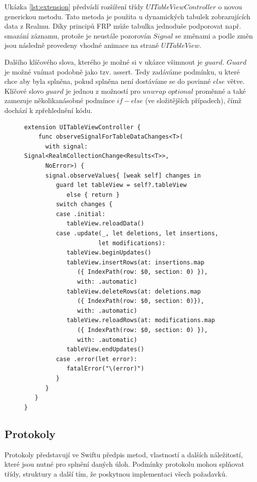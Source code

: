 \documentclass[thesis=M,czech]{FITthesis}[2012/06/26]
\begin{document}
Ukázka \ref{lst:extension} předvádí rozšíření třídy $UITableViewController$ o novou generickou metodu. Tato metoda je použita u dynamických tabulek zobrazujících data z Realmu. Díky principů FRP může tabulka jednoduše podporovat např. smazání záznamu, protože je neustále pozorován $Signal$ se změnami a podle změn jsou následně provedeny vhodné animace na straně $UITableView$.

Dalšího klíčového slova, kterého je možné si v ukázce všimnout je $guard$. $Guard$ je možné vnímat podobně jako tzv. assert. Tedy zadáváme podmínku, u které chce aby byla splněna, pokud splněna není dostáváme se do povinné $else$ větve. Klíčové slovo $guard$ je jednou z možností pro $unwrap$ $optional$ proměnné a také zamezuje několikanásobné podmínce $if-else$ (ve složitějších případech), čímž dochází k zpřehlednění kódu. \cite{devGuard}

\begin{figure}
\begin{minipage}{\linewidth}
\begin{lstlisting}[caption={Ukázka Extension},label={lst:extension}]
extension UITableViewController {
    func observeSignalForTableDataChanges<T>(
      with signal: Signal<RealmCollectionChange<Results<T>>,
      NoError>) {
      signal.observeValues{ [weak self] changes in
         guard let tableView = self?.tableView
            else { return }
         switch changes {
         case .initial:
            tableView.reloadData()
         case .update(_, let deletions, let insertions,
                     let modifications):
            tableView.beginUpdates()
            tableView.insertRows(at: insertions.map
               ({ IndexPath(row: $0, section: 0) }),
               with: .automatic)
            tableView.deleteRows(at: deletions.map
               ({ IndexPath(row: $0, section: 0)}),
               with: .automatic)
            tableView.reloadRows(at: modifications.map
               ({ IndexPath(row: $0, section: 0) }),
               with: .automatic)
            tableView.endUpdates()
         case .error(let error):
            fatalError("\(error)")
         }
      }
   }
}
\end{lstlisting}
\end{minipage}
\end{figure}
	
\subsection{Protokoly}
Protokoly představují ve Swiftu předpis metod, vlastností a dalších náležitostí, které jsou nutné pro splnění daných úloh. Podmínky protokolu mohou splňovat třídy, struktury a další tím, že poskytnou implementaci všech požadavků. \cite{devProtocol}
\end{document}

